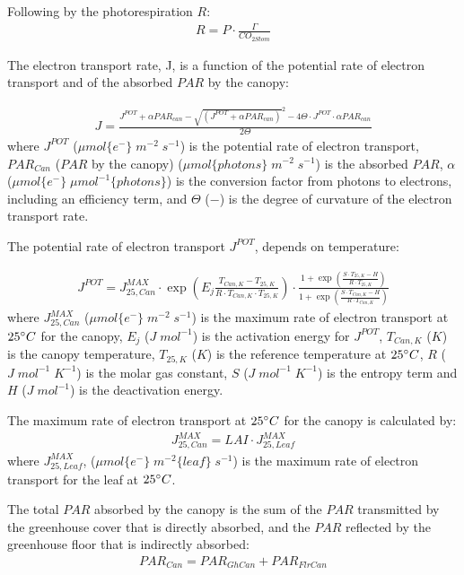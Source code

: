 \documentclass[a4paper]{article}
\begin{document}
Following by the photorespiration \(R\):
\begin{align}
  R = P \cdot \frac{\Gamma}{CO_{2Stom}}
\end{align}

The electron transport rate, J, is a function of the potential rate of electron transport and of the absorbed \(PAR\) by the canopy:

\begin{align}
  J = \frac{J^{POT} + \alpha PAR_{can} - {\sqrt{(J^{POT} + \alpha PAR_{can})}^2 - 4\Theta\cdot J^{POT}\cdot \alpha PAR_{can}}}{2 \Theta}
\end{align}
where \(J^{POT}\) (\(\mu mol\{e^-\}\;m^{-2}\;s^{-1}\)) is the potential rate of electron transport, \(PAR_{Can}\) (\(PAR\) by the canopy) (\(\mu mol\{photons\}\;m^{-2}\;s^{-1}\)) is the absorbed \(PAR\), \(\alpha\) (\(\mu mol\{e^-\}\;\mu mol^{-1}\{photons\}\)) is the conversion factor from photons to electrons, including an efficiency term, and \(\Theta\) (\(-\)) is the degree of curvature of the electron transport rate.

The potential rate of electron transport \(J^{POT}\), depends on temperature:

\begin{align}
  J^{POT} = J^{MAX}_{25,Can} \cdot \exp \left(E_j\frac{T_{Can,K}-T_{25,K}}{R\cdot T_{Can,K}\cdot T_{25,K}}\right) \cdot \frac{1 + \exp \left(\frac{S\cdot T_{25,K}-H}{R\cdot T_{25,K}}\right)}{1 + \exp \left(\frac{S\cdot T_{Can,K}-H}{R\cdot T_{Can,K}}\right)}
\end{align}
where \(J^{MAX}_{25,Can}\) (\(\mu mol \{e^-\}\;m^{-2}\;s^{-1}\)) is the maximum rate of electron transport at \(25 \degree C\) for the canopy, \(E_j\) (\(J\;mol^{-1}\)) is the activation energy for \(J^{POT}\), \(T_{Can,K}\) (\(K\)) is the canopy temperature, \(T_{25,K}\) (\(K\)) is the reference temperature at \(25 \degree C\), \(R\) (\(J\;mol^{-1}\;K^{-1}\)) is the molar gas constant, \(S\) (\(J\;mol^{-1}\;K^{-1}\)) is the entropy term and \(H\) (\(J\;mol^{-1}\)) is the deactivation energy.

The maximum rate of electron transport at \(25 \degree C\) for the canopy is calculated by:
\begin{align}
  J^{MAX}_{25,Can} = LAI \cdot J^{MAX}_{25,Leaf}
\end{align}
where \(J^{MAX}_{25,Leaf}\), (\(\mu mol\{e^-\}\;m^{-2}\{leaf\}\;s^{-1}\)) is the maximum rate of electron transport for the leaf at \(25 \degree C\).

The total \(PAR\) absorbed by the canopy is the sum of the \(PAR\) transmitted by the greenhouse cover that is directly absorbed, and the \(PAR\) reflected by the greenhouse floor that is indirectly absorbed:
\begin{align}
  PAR_{Can} = PAR_{GhCan} + PAR_{FlrCan}
\end{align}
\end{document}
